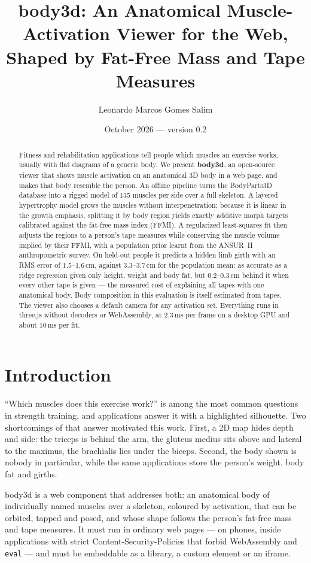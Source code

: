 \documentclass[10pt,twocolumn]{article}
\title{\textbf{body3d}: An Anatomical Muscle-Activation Viewer for the Web,\\ Shaped by Fat-Free Mass and Tape Measures}
\author{Leonardo Marcos Gomes Salim}
\date{October 2026 --- version 0.2}
\newcommand{\code}[1]{\texttt{#1}}
\begin{document}
\maketitle

\begin{abstract}
Fitness and rehabilitation applications tell people which muscles an exercise works, usually with
flat diagrams of a generic body. We present \textbf{body3d}, an open-source viewer that shows muscle
activation on an anatomical 3D body in a web page, and makes that body resemble the person. An
offline pipeline turns the BodyParts3D database into a rigged model of 135 muscles per side over a
full skeleton. A layered hypertrophy model grows the muscles without interpenetration; because it
is linear in the growth emphasis, splitting it by body region yields exactly additive morph targets
calibrated against the fat-free mass index (FFMI). A regularized least-squares fit then adjusts the
regions to a person's tape measures while conserving the muscle volume implied by their FFMI, with
a population prior learnt from the ANSUR~II anthropometric survey. On held-out people it predicts a
hidden limb girth with an RMS error of 1.5--1.6\,cm, against 3.3--3.7\,cm for the population mean:
as accurate as a ridge regression given only height, weight and body fat, but 0.2--0.3\,cm behind
it when every other tape is given --- the measured cost of explaining all tapes with one anatomical
body. Body composition in this evaluation is itself estimated from tapes. The viewer also chooses a
default camera for any activation set. Everything runs in three.js without decoders or WebAssembly,
at 2.3\,ms per frame on a desktop GPU and about 10\,ms per fit.
\end{abstract}

\section{Introduction}

``Which muscles does this exercise work?'' is among the most common questions in strength training,
and applications answer it with a highlighted silhouette. Two shortcomings of that answer motivated
this work. First, a 2D map hides depth and side: the triceps is behind the arm, the gluteus medius
sits above and lateral to the maximus, the brachialis lies under the biceps. Second, the body shown
is nobody in particular, while the same applications store the person's weight, body fat and girths.

body3d is a web component that addresses both: an anatomical body of individually named muscles
over a skeleton, coloured by activation, that can be orbited, tapped and posed, and whose shape
follows the person's fat-free mass and tape measures. It must run in ordinary web pages --- on
phones, inside applications with strict Content-Security-Policies that forbid WebAssembly and
\code{eval} --- and must be embeddable as a library, a custom element or an iframe.
\end{document}
